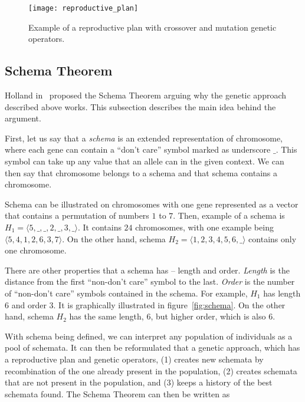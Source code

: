 \begin{figure}[h]
    \texttt{[image: reproductive\_plan]}
    \caption[Example of a reproductive plan]{Example of a reproductive plan with crossover and mutation genetic operators.}
    \label{fig:reproductive-plan}
\end{figure}

\subsection{Schema Theorem}\label{subsec:schema-theorem}

Holland in~\cite{hollandAdaptationNaturalArtificial1975} proposed
the Schema Theorem arguing why the genetic approach described above works.
This subsection describes the main idea behind the argument.

First, let us say that a \textit{schema} is an extended representation of chromosome,
where each gene can contain a “don’t care” symbol marked as underscore $\_$.
This symbol can take up any value that an allele can in the given context.
We can then say that chromosome belongs to a schema
and that schema contains a chromosome.

Schema can be illustrated on chromosomes with one gene represented as
a vector that contains a permutation of numbers $1$ to $7$.
Then, example of a schema is $H_1 = \langle 5, \_, \_, 2, \_, 3, \_ \rangle$.
It contains $24$ chromosomes, with one example being $\langle 5, 4, 1, 2, 6, 3, 7 \rangle$.
On the other hand, schema $H_2 = \langle 1, 2, 3, 4, 5, 6, \_ \rangle$ contains only one chromosome.

There are other properties that a schema has – length and order.
\textit{Length} is the distance from the first “non-don’t care” symbol to the last.
\textit{Order} is the number of “non-don’t care” symbols contained in the schema.
For example, $H_1$ has length $6$ and order $3$.
It is graphically illustrated in figure~\ref{fig:schema}.
On the other hand, schema $H_2$ has the same length, $6$, but higher order, which is also $6$.

With schema being defined, we can interpret any population of individuals as a pool of schemata.
It can then be reformulated that a genetic approach, which has a reproductive plan and
genetic operators, (1) creates new schemata by recombination of the one already present in the population,
(2) creates schemata that are not present in the population, and (3) keeps a history of the best schemata found.
The Schema Theorem can then be written as

